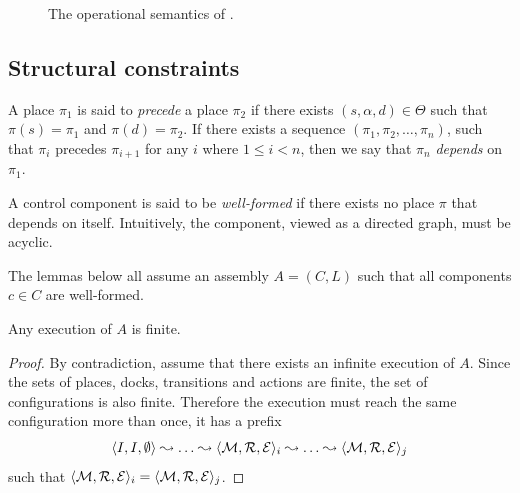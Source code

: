 {\begin{figure}[tp]
  \caption{The operational semantics of \mad.}
  \label{fig:rules}
\end{figure}

\subsection{Structural constraints}

  A place $\pi_1$ is said to \emph{precede} a place $\pi_2$ if there
  exists $(s, \alpha, d) \in \Theta$ such that $\pi(s) = \pi_1$ and
  $\pi(d) = \pi_2$.  If there exists a sequence $(\pi_1, \pi_2, \dots,
  \pi_n)$, such that $\pi_{i}$ precedes $\pi_{i+1}$ for any $i$ where
  $1 \le i < n$, then we say that $\pi_n$ \emph{depends} on $\pi_1$.

  A \mad control component is said to be \emph{well-formed} if there exists no
  place $\pi$ that depends on itself. Intuitively, the component,
  viewed as a directed graph, must be acyclic.

  The lemmas below all assume an assembly $A = (C, L)$ such that all
  components $c \in C$ are well-formed.

  \begin{lemma}\label{thm:finite}
    Any execution of $A$ is finite.
  \end{lemma}

  \begin{proof}
    By contradiction, assume that there exists an infinite execution
    of $A$. Since the sets of places, docks, transitions and actions
    are finite, the set of configurations is also finite. Therefore
    the execution must reach the same configuration more than once,
    \ie it has a prefix
    \[
    \langle I, I, \emptyset \rangle \semstep \dots \semstep \langle \mk, \reached, \exec \rangle_i \semstep \dots \semstep \langle \mk, \reached, \exec \rangle_j
    \]
    such that $\langle \mathcal{M}, \mathcal{R}, \mathcal{E} \rangle_i = \langle \mathcal{M},
    \mathcal{R}, \mathcal{E} \rangle_j$.


\end{proof}}
